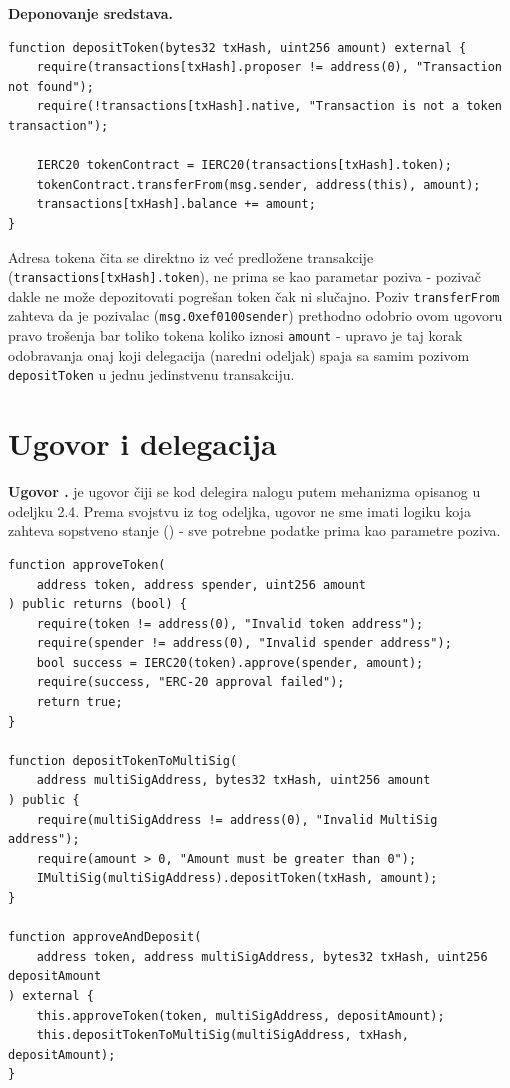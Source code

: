 \textbf{Deponovanje sredstava.}

\begin{lstlisting}[caption={Deponovanje \en{ERC20} tokena}, label={lst:multisig-deposit}]
function depositToken(bytes32 txHash, uint256 amount) external {
    require(transactions[txHash].proposer != address(0), "Transaction not found");
    require(!transactions[txHash].native, "Transaction is not a token transaction");

    IERC20 tokenContract = IERC20(transactions[txHash].token);
    tokenContract.transferFrom(msg.sender, address(this), amount);
    transactions[txHash].balance += amount;
}
\end{lstlisting}

Adresa tokena \v cita se direktno iz ve\' c predlo\v zene transakcije (\texttt{transactions[txHash].token}), ne prima se kao parametar poziva - poziva\v c dakle ne mo\v ze depozitovati pogre\v san token \v cak ni slu\v cajno. Poziv \texttt{transferFrom} zahteva da je pozivalac (\texttt{msg.0xef0100sender}) prethodno odobrio ovom ugovoru pravo tro\v senja bar toliko tokena koliko iznosi \texttt{amount} - upravo je taj korak odobravanja onaj koji  delegacija (naredni odeljak) spaja sa samim pozivom \texttt{depositToken} u jednu jedinstvenu transakciju.

\section{Ugovor  i  delegacija}

\textbf{Ugovor .}  je ugovor \v ciji se kod delegira  nalogu putem  mehanizma opisanog u odeljku 2.4. Prema svojstvu iz tog odeljka, ugovor ne sme imati logiku koja zahteva sopstveno  stanje () - sve potrebne podatke prima kao parametre poziva.

\begin{lstlisting}[caption={Osnovne funkcije ugovora \texttt{Approver}}, label={lst:approver-core}]
function approveToken(
    address token, address spender, uint256 amount
) public returns (bool) {
    require(token != address(0), "Invalid token address");
    require(spender != address(0), "Invalid spender address");
    bool success = IERC20(token).approve(spender, amount);
    require(success, "ERC-20 approval failed");
    return true;
}

function depositTokenToMultiSig(
    address multiSigAddress, bytes32 txHash, uint256 amount
) public {
    require(multiSigAddress != address(0), "Invalid MultiSig address");
    require(amount > 0, "Amount must be greater than 0");
    IMultiSig(multiSigAddress).depositToken(txHash, amount);
}

function approveAndDeposit(
    address token, address multiSigAddress, bytes32 txHash, uint256 depositAmount
) external {
    this.approveToken(token, multiSigAddress, depositAmount);
    this.depositTokenToMultiSig(multiSigAddress, txHash, depositAmount);
}
\end{lstlisting}

